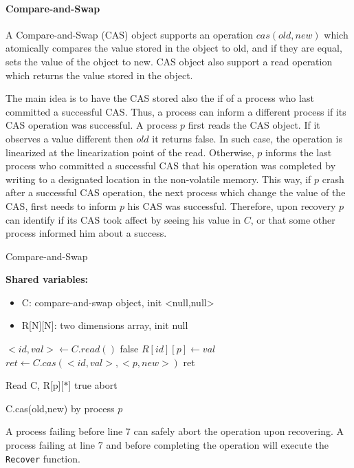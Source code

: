 \paragraph*{Compare-and-Swap}

A Compare-and-Swap (CAS) object supports an operation $cas(old,new)$ which atomically compares the value stored in the object to old, and if they are equal, sets the value of the object to new. CAS object also support a read operation which returns the value stored in the object.

The main idea is to have the CAS stored also the if of a process who last committed a successful CAS. Thus, a process can inform a different process if its CAS operation was successful.
A process $p$ first reads the CAS object. If it observes a value different then $old$ it returns false. In such case, the operation is linearized at the linearization point of the read. Otherwise, $p$ informs the last process who committed a successful CAS that his operation was completed by writing to a designated location in the non-volatile memory. This way, if $p$ crash after a successful CAS operation, the next process which change the value of the CAS, first needs to inform $p$ his CAS was successful. Therefore, upon recovery $p$ can identify if its CAS took affect by seeing his value in $C$, or that some other process informed him about a success.

\begin{algorithm}
	\caption{Compare-and-Swap}\label{recoverable CAS}
	
	\hspace*{\algorithmicindent} \textbf{Shared variables:}
	\begin{itemize}
		\item C: compare-and-swap object, init <null,null>
		\item R[N][N]: two dimensions array, init null
	\end{itemize}
 
	\begin{algorithmic}[1]
		\State $<id,val> \gets C.read()$
		\State \Return false
		\EndIf
		\State $R[id][p] \gets val$
		\EndIf
		\State $ret \gets C.cas(<id,val>, <p,new>)$
		\State \Return ret
		\EndProcedure
		
		\State Read C, R[p][$*$]
		\State \Return true
		\Else {}
		\State \Return abort
		\EndIf
		\EndProcedure
	\end{algorithmic}
	\caption{C.cas(old,new) by process $p$}
\end{algorithm}


A process failing before line 7 can safely abort the operation upon recovering. A process failing at line 7 and before completing the operation will execute the \texttt{Recover} function.